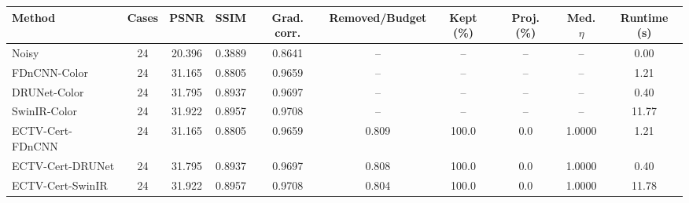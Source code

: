 \begin{tabular}{lccccccccc}
\toprule
Method & Cases & PSNR & SSIM & Grad. corr. & Removed/Budget & Kept (\%) & Proj. (\%) & Med. $\eta$ & Runtime (s) \\
\midrule
Noisy & 24 & 20.396 & 0.3889 & 0.8641 & -- & -- & -- & -- & 0.00 \\
FDnCNN-Color & 24 & 31.165 & 0.8805 & 0.9659 & -- & -- & -- & -- & 1.21 \\
DRUNet-Color & 24 & 31.795 & 0.8937 & 0.9697 & -- & -- & -- & -- & 0.40 \\
SwinIR-Color & 24 & 31.922 & 0.8957 & 0.9708 & -- & -- & -- & -- & 11.77 \\
ECTV-Cert-FDnCNN & 24 & 31.165 & 0.8805 & 0.9659 & 0.809 & 100.0 & 0.0 & 1.0000 & 1.21 \\
ECTV-Cert-DRUNet & 24 & 31.795 & 0.8937 & 0.9697 & 0.808 & 100.0 & 0.0 & 1.0000 & 0.40 \\
ECTV-Cert-SwinIR & 24 & 31.922 & 0.8957 & 0.9708 & 0.804 & 100.0 & 0.0 & 1.0000 & 11.78 \\
\bottomrule
\end{tabular}
